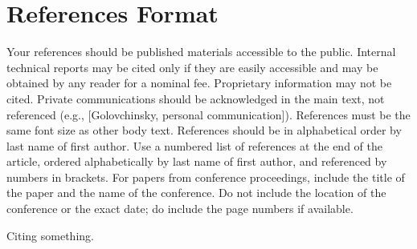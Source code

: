 \documentclass{sigchi}
\begin{document}
\section{References Format}
Your references should be published materials accessible to the
public. Internal technical reports may be cited only if they are
easily accessible and may be obtained by any reader for a nominal
fee. Proprietary information may not be cited. Private communications
should be acknowledged in the main text, not referenced (e.g.,
[Golovchinsky, personal communication]). References must be the same
font size as other body text. References should be in alphabetical
order by last name of first author. Use a numbered list of references
at the end of the article, ordered alphabetically by last name of
first author, and referenced by numbers in brackets. For papers from
conference proceedings, include the title of the paper and the name of
the conference. Do not include the location of the conference or the
exact date; do include the page numbers if available. 

Citing something\cite{unrealweb}. \cite{wizard} \cite{infinityw} \cite{infinitya}


\balance{}




\end{document}
